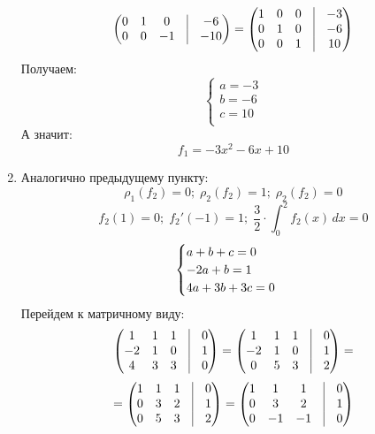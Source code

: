 \documentclass[a4paper,12pt]{article}
\begin{document}
\begin{enumerate}
\[\begin{pmatrix}
0 & 1 & 0 & \vrule &-6  \\
0 & 0 & -1 & \vrule &-10 \\
\end{pmatrix}
=
\begin{pmatrix}
1 & 0 & 0 & \vrule &-3  \\
0 & 1 & 0 & \vrule &-6  \\
0 & 0 & 1 & \vrule &10  \\
\end{pmatrix}
\]
Получаем:
\[
\begin{cases}
a = -3 \\
b = -6 \\
c = 10\\
\end{cases}
\]
А значит:
\[
f_1 = -3x^2 -6x + 10
\]
\item Аналогично предыдущему пункту:
\[
\rho_1(f_2) = 0; \; \rho_2(f_2) = 1; \; \rho_2(f_2) = 0
\]
\[
f_2(1)  = 0; \; f_2'(-1) = 1; \; \frac{3}{2} \cdot \int_{0}^{2} f_2(x) \, dx = 0
\]
\[
\begin{cases}
a + b + c = 0 \\
-2a + b = 1 \\
4a +3b + 3c = 0\\
\end{cases}\\
\]
Перейдем к матричному виду:
\[
\begin{pmatrix}
1 & 1 & 1 & \vrule &0 \\
-2 & 1 & 0 & \vrule &1 \\
4 & 3 & 3 & \vrule &0  \\
\end{pmatrix}
=
\begin{pmatrix}
1 & 1 & 1 & \vrule &0  \\
-2 & 1 & 0 & \vrule &1 \\
0 & 5 & 3 & \vrule &2  \\
\end{pmatrix}
=
\]
\[
=
\begin{pmatrix}
1 & 1 & 1 & \vrule &0  \\
0 & 3 & 2 & \vrule &1  \\
0 & 5 & 3 & \vrule &2  \\
\end{pmatrix}
=
\begin{pmatrix}
1 & 1 & 1 & \vrule &0  \\
0 & 3 & 2 & \vrule &1 \\
0 & -1 & -1 & \vrule &0 \\
\end{pmatrix}
\]
\end{enumerate}
\end{document}
